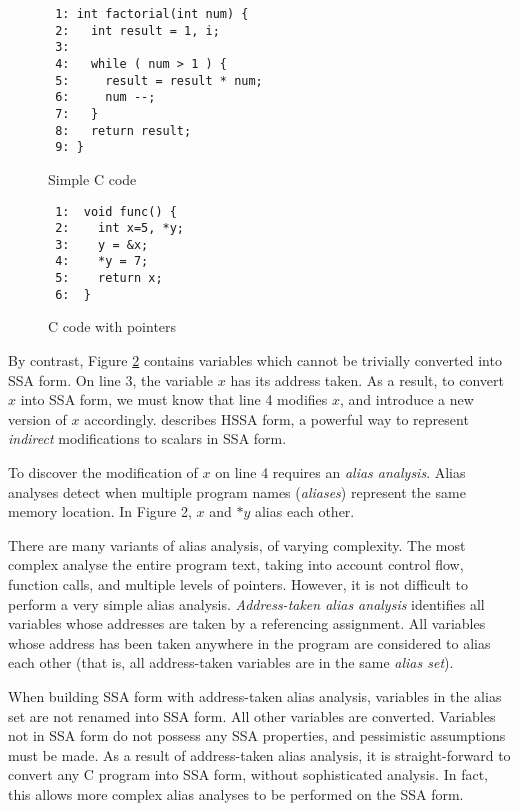 \begin{figure}[thp]
\begin{verbatim}
 1: int factorial(int num) {
 2:   int result = 1, i;
 3: 
 4:   while ( num > 1 ) {
 5:     result = result * num;
 6:     num --;
 7:   }
 8:   return result;
 9: }
\end{verbatim}
\caption{Simple C code}
\label{c-easy-example}
\end{figure}


\begin{figure}[thp]
\begin{verbatim}
 1:  void func() {
 2:    int x=5, *y;
 3:    y = &x;
 4:    *y = 7;
 5:    return x;
 6:  }
\end{verbatim}
\caption{C code with pointers}
\label{c-hard-example}
\end{figure}




By contrast, Figure \ref{c-hard-example} contains variables which
cannot be trivially converted into SSA form.  On line 3, the variable
$x$ has its address taken.  As a result, to convert $x$ into SSA form,
we must know that line 4 modifies $x$, and introduce a new version of
$x$ accordingly.   describes HSSA form, a powerful way to
represent \textit{indirect} modifications to scalars in SSA form.

To discover the modification of $x$ on line 4 requires an
\textit{alias analysis}.  Alias analyses detect when multiple program
names (\textit{aliases}) represent the same memory location.  In
Figure 2, $x$ and $*y$ alias each other.

There are many variants of alias analysis, of varying complexity.  The
most complex analyse the entire program text, taking into account
control flow, function calls, and multiple levels of pointers.
However, it is not difficult to perform a very simple alias analysis.
\textit{Address-taken alias analysis} identifies all variables whose
addresses are taken by a referencing assignment.  All variables whose
address has been taken anywhere in the program are considered to alias
each other (that is, all address-taken variables are in the same
\textit{alias set}).

When building SSA form with address-taken alias analysis, variables in
the alias set are not renamed into SSA form.  All other variables are
converted.  Variables not in SSA form do not possess any SSA
properties, and pessimistic assumptions must be made.  As a result of
address-taken alias analysis, it is straight-forward to convert any C
program into SSA form, without sophisticated analysis.  In fact, this
allows more complex alias analyses to be performed on the SSA form.

